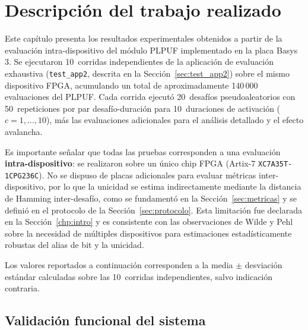 
\chapter{Descripción del trabajo realizado}
\label{ch:trabajo}

Este capítulo presenta los resultados experimentales obtenidos a partir de la
evaluación intra-dispositivo del módulo PLPUF implementado en la placa
Basys\,3. Se ejecutaron 10~corridas independientes de la aplicación de
evaluación exhaustiva (\texttt{test\_app2}, descrita en la
Sección~\ref{sec:test_app2}) sobre el mismo dispositivo FPGA, acumulando un
total de aproximadamente 140\,000 evaluaciones del PLPUF. Cada corrida
ejecutó 20~desafíos pseudoaleatorios con 50~repeticiones por par
desafío-duración para 10~duraciones de activación ($c = 1, \ldots, 10$), más
las evaluaciones adicionales para el análisis detallado y el efecto avalancha.

Es importante señalar que todas las pruebas corresponden a una evaluación
\textbf{intra-dispositivo}: se realizaron sobre un único chip FPGA
(Artix-7 \texttt{XC7A35T-1CPG236C}). No se dispuso de placas adicionales
para evaluar métricas inter-dispositivo, por lo que la unicidad se estima
indirectamente mediante la distancia de Hamming inter-desafío, como se
fundamentó en la Sección~\ref{sec:metricas} y se definió en el protocolo de
la Sección~\ref{sec:protocolo}. Esta limitación fue declarada en la
Sección~\ref{chp:intro} y es consistente con las observaciones de
Wilde y Pehl~\cite{wilde_2020_confidence} sobre la necesidad de múltiples
dispositivos para estimaciones estadísticamente robustas del alias de bit y
la unicidad.

Los valores reportados a continuación corresponden a la media $\pm$
desviación estándar calculadas sobre las 10~corridas independientes, salvo
indicación contraria.

\section{Validación funcional del sistema}
\label{sec:res_funcional}

